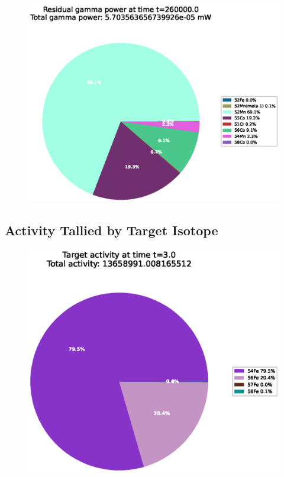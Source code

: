 \begin{figure}[!htb]
\centering
\includegraphics[width=0.8\linewidth]{chapters/results_activity_code/fe-activity-v2/residual-energy/0300_260000.eps}
\caption{}
\label{fig:activity-v2-residual-power-260000s}
\end{figure}



\clearpage

\subsection{Activity Tallied by Target Isotope}

\FloatBarrier


\begin{figure}[!htb]
\centering
\includegraphics[width=0.8\linewidth]{chapters/results_activity_code/fe-activity-v2/target-activity/0001_3.eps}
\caption{}
\label{fig:activity-v2-target-activity-3s}
\end{figure}

